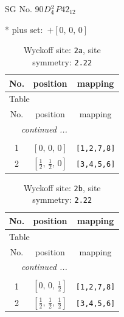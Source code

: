 \documentclass[fleqn,8pt]{jsarticle}
\begin{document}
\setcounter{MaxMatrixCols}{32}

\renewcommand{\tablename}{Table~}
\renewcommand{\figurename}{Figure~}
\begin{center}
\LARGE
SG No. 90\quad$D_{\rm 4}^{2}$\quad$P42_12$\quad[ tetragonal ]
\end{center}
* plus set:\,\,\,$+\left[ 0,\, 0,\, 0 \right]$
\renewcommand{\arraystretch}{1.2}
\begin{longtable}{ccc}
\caption{Wyckoff site: {\tt 2a}, site symmetry: {\tt 2.22}}
 \\
 \hline \hline
No. & position & mapping \\ \hline \endfirsthead

\multicolumn{2}{l}{\tablename\ \thetable{}} \\
 \hline \hline
No. & position & mapping \\ \hline \endhead

 \hline \hline
\multicolumn{2}{r}{\footnotesize\it continued ...} \\ \endfoot

 \hline \hline
\multicolumn{2}{r}{} \\ \endlastfoot

1 & $\left[ 0,\, 0,\, 0 \right]$ & {\tt [1,2,7,8]} \\ \hline
2 & $\left[ \frac{1}{2},\, \frac{1}{2},\, 0 \right]$ & {\tt [3,4,5,6]} \\
\end{longtable}
\renewcommand{\arraystretch}{1.2}
\begin{longtable}{ccc}
\caption{Wyckoff site: {\tt 2b}, site symmetry: {\tt 2.22}}
 \\
 \hline \hline
No. & position & mapping \\ \hline \endfirsthead

\multicolumn{2}{l}{\tablename\ \thetable{}} \\
 \hline \hline
No. & position & mapping \\ \hline \endhead

 \hline \hline
\multicolumn{2}{r}{\footnotesize\it continued ...} \\ \endfoot

 \hline \hline
\multicolumn{2}{r}{} \\ \endlastfoot

1 & $\left[ 0,\, 0,\, \frac{1}{2} \right]$ & {\tt [1,2,7,8]} \\ \hline
2 & $\left[ \frac{1}{2},\, \frac{1}{2},\, \frac{1}{2} \right]$ & {\tt [3,4,5,6]} \\
\end{longtable}
\end{document}
